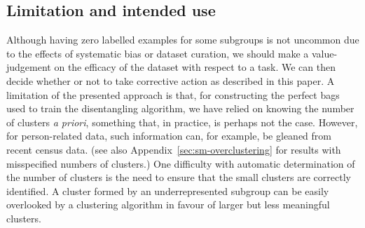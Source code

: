 \subsection{Limitation and intended use}
\label{sec:sm-limitations}
%
Although having zero labelled examples for some subgroups is not uncommon due to the effects of
systematic bias or dataset curation, we should make a value-judgement on the efficacy of the dataset
with respect to a task.
%
We can then decide whether or not to take corrective action as described in this paper.
%
A limitation of the presented approach is that, for constructing the perfect bags used to train the
disentangling algorithm, we have relied on knowing the number of clusters \emph{a priori},
something that, in practice, is perhaps not the case. However, for person-related data, such
information can, for example, be gleaned from recent census data. 
%
(see also Appendix~\ref{sec:sm-overclustering} for results with misspecified numbers of clusters.)
%
%
One difficulty with automatic determination of the number of clusters is the need to ensure that
the small
clusters are correctly identified. 
%
A cluster formed by an underrepresented subgroup can be easily overlooked by a clustering algorithm
in favour of larger but less meaningful clusters.
